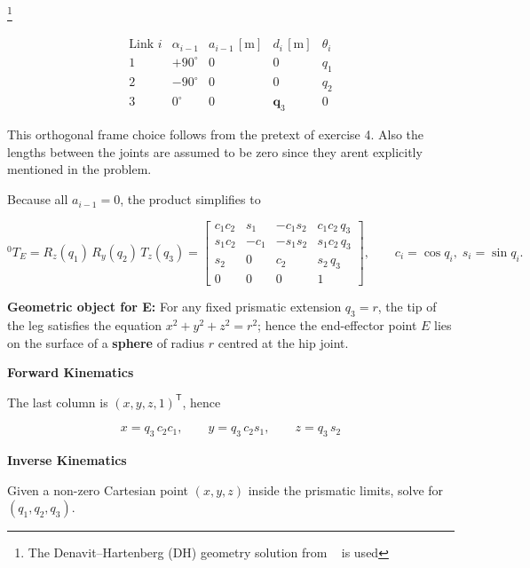 \documentclass[12pt,a4paper]{article}
\begin{document}
\footnote{The Denavit–Hartenberg (DH) geometry solution from ~\cite{Spong2006} is used}

\[
\begin{array}{c|c|c|c|c}
\text{Link }i & \alpha_{i-1} & a_{i-1}\,[\mathrm m] & d_i\,[\mathrm m] & \theta_i \\ \hline
1 & +90^{\circ} & 0 & 0 & q_1 \\
2 & -90^{\circ} & 0 & 0 & q_2 \\
3 & 0^{\circ}   & 0 & \mathbf q_3 & 0
\end{array}
\]

This orthogonal frame choice follows from the pretext of exercise 4. Also the lengths between the joints are assumed to be zero since they arent explicitly mentioned in the problem.


Because all $a_{i-1}=0$, the product simplifies to

\[
{}^{0}\!T_E
  = R_{z}(q_1)\,R_{y}(q_2)\,T_{z}(q_3)
  =
  \begin{bmatrix}
   c_{1}c_{2} &  s_{1} & -c_{1}s_{2} & c_{1}c_{2}\,q_{3}\\
   s_{1}c_{2} & -c_{1} & -s_{1}s_{2} & s_{1}c_{2}\,q_{3}\\
   s_{2}      &  0     &  c_{2}      & s_{2}\,q_{3}\\
   0&0&0&1
  \end{bmatrix},
\qquad
c_{i}\!=\!\cos q_{i},\; s_{i}\!=\!\sin q_{i}.
\]


\textbf{Geometric object for E:}
For any fixed prismatic extension \(q_{3}=r\), the tip of the leg satisfies the equation
\(x^{2}+y^{2}+z^{2}=r^{2}\); hence the end-effector point \(E\) lies on the surface of a
\textbf{sphere} of radius \(r\) centred at the hip joint.


\textbf{Forward Kinematics}

The last column is \((x,y,z,1)^{\mathsf T}\), hence

\begin{align*}
x=q_{3}\,c_{2}c_{1},\qquad
y=q_{3}\,c_{2}s_{1},\qquad
z=q_{3}\,s_{2}
\end{align*}


\textbf{Inverse Kinematics}

Given a non-zero Cartesian point \((x,y,z)\) inside the prismatic limits, solve
for \((q_{1},q_{2},q_{3})\).
\end{document}
